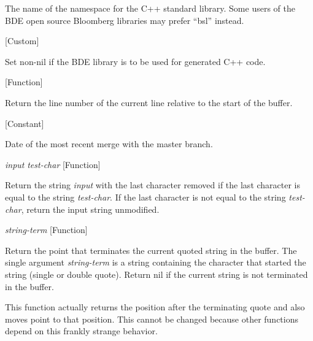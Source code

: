 \begin{doc-string}
The name of the namespace for the C++ standard library.  Some users of the
BDE open source Bloomberg libraries may prefer ``bsl'' instead.
\end{doc-string}

\vspace{1em}
\noindent
{}
\usebox{\funcname}
 \hfill [Custom]

\begin{doc-string}
Set non-nil if the BDE library is to be used for generated C++ code.
\end{doc-string}

\vspace{1em}
\noindent
{}
\usebox{\funcname}
 \hfill [Function]

\begin{doc-string}
Return the line number of the current line relative to the start of the buffer.
\end{doc-string}

\vspace{1em}
\noindent
{}
\usebox{\funcname}
 \hfill [Constant]

\begin{doc-string}
Date of the most recent merge with the master branch.
\end{doc-string}

\vspace{1em}
\noindent
{}
\usebox{\funcname}\emph{input} \emph{test-char}
 \hfill [Function]

\begin{doc-string}
Return the string \emph{input} with the last character removed if the last character
is equal to the string \emph{test-char}.  If the last character is not equal to the
string \emph{test-char}, return the input string unmodified.
\end{doc-string}

\vspace{1em}
\noindent
{}
\usebox{\funcname}\emph{string-term}
 \hfill [Function]

\begin{doc-string}
Return the point that terminates the current quoted string in the buffer.
The single argument \emph{string-term} is a string containing the character that
started the string (single or double quote).  Return nil if the current
string is not terminated in the buffer.

This function actually returns the position after the terminating quote and
also moves point to that position.  This cannot be changed because other
functions depend on this frankly strange behavior.
\end{doc-string}

